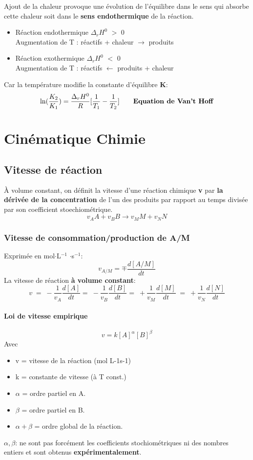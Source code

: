 \documentclass[10pt,a4paper]{book}
\begin{document}
Ajout de la chaleur provoque une évolution de l’équilibre dans le sens qui absorbe cette chaleur soit dans le \textbf{sens endothermique} de la réaction.
\begin{itemize}
\item Réaction endothermique $\Delta_rH^0$ $>$ 0 \\
Augmentation de T : réactifs + chaleur $\rightarrow$ produits
\item Réaction exothermique $\Delta_rH^0$ $<$ 0 \\
Augmentation de T : réactifs $\leftarrow$ produits + chaleur
\end{itemize} \par
Car la température modifie la constante d'équilibre \textbf{K}:
\[\ln(\frac{K_2}{K_1}) = \frac{\Delta_rH^0}{R}[\frac{1}{T_1}-\frac{1}{T_2}] \tag*{\textbf{Equation de Van’t Hoff}}\]

\chapter{Cinématique Chimie}

\section{Vitesse de réaction}
À volume constant, on définit la vitesse d’une réaction chimique \textbf{v} par \textbf{la dérivée de la concentration} de l’un des produits par rapport au temps divisée par son coefficient stoechiométrique.
\[v_AA + v_BB \longrightarrow v_MM + v_NN\]

\subsection{Vitesse de consommation/production de A/M}

Exprimée en mol$\cdot$L$^{-1}$ $\cdot$s$^{-1}$:
\[v_{A/M} = \mp \frac{d[A/M]}{dt}\]
La vitesse de réaction \textbf{à volume constant}:
\[v \; = \; -\frac{1}{v_A}\frac{d[A]}{dt} =\; -\frac{1}{v_B}\frac{d[B]}{dt} = \; +\frac{1}{v_M}\frac{d[M]}{dt} \; = \; +\frac{1}{v_N}\frac{d[N]}{dt}\] 

\subsubsection{Loi de vitesse empirique}

\[v = k[A]^{\alpha}[B]^{\beta}\]
Avec
\begin{itemize}
\item v = vitesse de la réaction (mol L-1s-1)
\item k = constante de vitesse (à T const.)
\item $\alpha$ = ordre partiel en A.
\item $\beta$ = ordre partiel en B.
\item \(\alpha + \beta\) = ordre global de la réaction.
\end{itemize}
\(\alpha, \beta\): ne sont pas forcément les coefficients stochiométriques ni des nombres entiers et sont obtenus \textbf{expérimentalement}.
\end{document}
